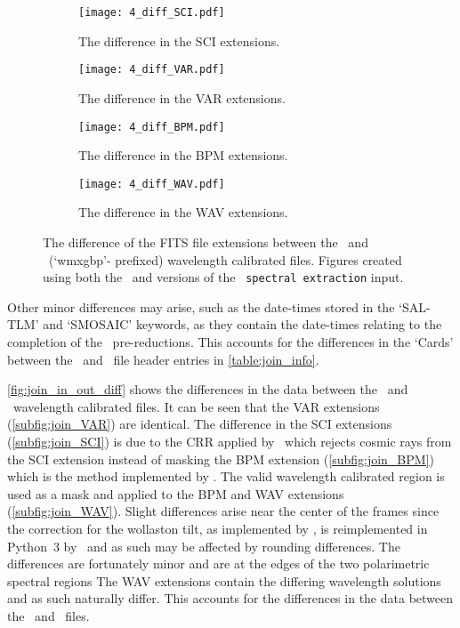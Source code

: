 \begin{figure}
    \centering
    \begin{subfigure}[b]{\textwidth}
        \centering
        \texttt{[image: 4\_diff\_SCI.pdf]}
        \caption{The difference in the \gls{SCI} extensions.}
        \label{subfig:join_SCI}
    \end{subfigure}
    \hfill
    \begin{subfigure}[b]{\textwidth}
        \centering
        \texttt{[image: 4\_diff\_VAR.pdf]}
        \caption{The difference in the \gls{VAR} extensions.}
        \label{subfig:join_VAR}
    \end{subfigure}
    \hfill
    \begin{subfigure}[b]{\textwidth}
        \centering
        \texttt{[image: 4\_diff\_BPM.pdf]}
        \caption{The difference in the \gls{BPM} extensions.}
        \label{subfig:join_BPM}
    \end{subfigure}
    \hfill
    \begin{subfigure}[b]{\textwidth}
        \centering
        \texttt{[image: 4\_diff\_WAV.pdf]}
        \caption{The difference in the \gls{WAV} extensions.}
        \label{subfig:join_WAV}
    \end{subfigure}
    \caption{The difference of the \gls{FITS} file extensions between the \polsalt\ and \stops\ (`wmxgbp'- prefixed) wavelength calibrated files. Figures created using both the \polsalt\ and \stops versions of the \polsalt\ \texttt{spectral extraction} input.}
    \label{fig:join_in_out_diff}
\end{figure}

Other minor differences may arise, such as the date-times stored in the `SAL-TLM' and `SMOSAIC' keywords, as they contain the date-times relating to the completion of the \polsalt\ pre-reductions.
This accounts for the differences in the `Cards' between the \polsalt\ and \stops\ file header entries in \autoref{table:join_info}.

\autoref{fig:join_in_out_diff} shows the differences in the data between the \polsalt\ and \stops\ wavelength calibrated files.
It can be seen that the \gls{VAR} extensions (\autoref{subfig:join_VAR}) are identical.
The difference in the \gls{SCI} extensions (\autoref{subfig:join_SCI}) is due to the \gls{CRR} applied by \stops\, which rejects cosmic rays from the \gls{SCI} extension instead of masking the \gls{BPM} extension (\autoref{subfig:join_BPM}) which is the method implemented by \polsalt.
The valid wavelength calibrated region is used as a mask and applied to the \gls{BPM} and \gls{WAV} extensions (\autoref{subfig:join_WAV}).
Slight differences arise near the center of the frames since the correction for the wollaston tilt, as implemented by \polsalt, is reimplemented in Python~$3$ by \stops\ and as such may be affected by rounding differences.
The differences are fortunately minor and are at the edges of the two polarimetric spectral regions
The \gls{WAV} extensions contain the differing wavelength solutions and as such naturally differ.
This accounts for the differences in the data between the \polsalt\ and \stops\ files.

